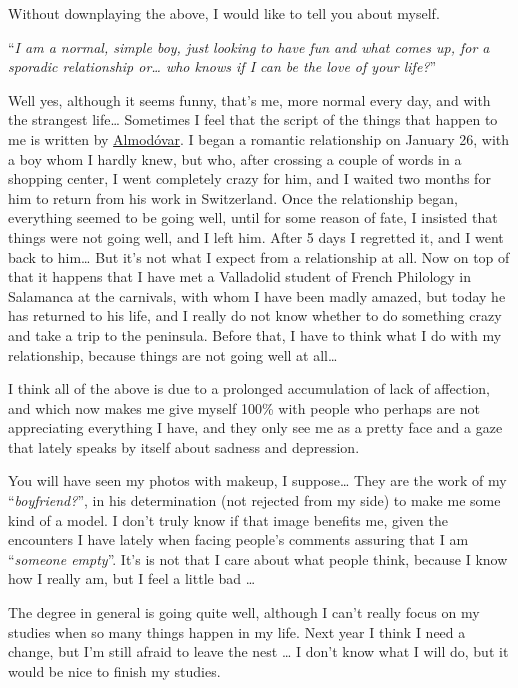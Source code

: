 \documentclass[]{book}
\begin{document}
Without downplaying the above, I would like to tell you about myself.

``\emph{I am a normal, simple boy, just looking to have fun and what comes up, for a sporadic relationship or\ldots{} who knows if I can be the love of your life?}''

Well yes, although it seems funny, that's me, more normal every day, and with the strangest life\ldots{} Sometimes I feel that the script of the things that happen to me is written by \href{https://en.wikipedia.org/wiki/Pedro_Almod\%C3\%B3var}{Almodóvar}. I began a romantic relationship on January 26, with a boy whom I hardly knew, but who, after crossing a couple of words in a shopping center, I went completely crazy for him, and I waited two months for him to return from his work in Switzerland. Once the relationship began, everything seemed to be going well, until for some reason of fate, I insisted that things were not going well, and I left him. After 5 days I regretted it, and I went back to him\ldots{} But it's not what I expect from a relationship at all. Now on top of that it happens that I have met a Valladolid student of French Philology in Salamanca at the carnivals, with whom I have been madly amazed, but today he has returned to his life, and I really do not know whether to do something crazy and take a trip to the peninsula. Before that, I have to think what I do with my relationship, because things are not going well at all\ldots{}

I think all of the above is due to a prolonged accumulation of lack of affection, and which now makes me give myself 100\% with people who perhaps are not appreciating everything I have, and they only see me as a pretty face and a gaze that lately speaks by itself about sadness and depression.

You will have seen my photos with makeup, I suppose\ldots{} They are the work of my ``\emph{boyfriend?}'', in his determination (not rejected from my side) to make me some kind of a model. I don't truly know if that image benefits me, given the encounters I have lately when facing people's comments assuring that I am ``\emph{someone empty}''. It's is not that I care about what people think, because I know how I really am, but I feel a little bad \ldots{}

The degree in general is going quite well, although I can't really focus on my studies when so many things happen in my life. Next year I think I need a change, but I'm still afraid to leave the nest \ldots{} I don't know what I will do, but it would be nice to finish my studies.
\end{document}
